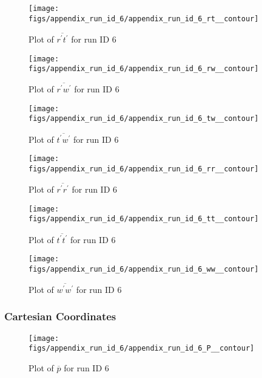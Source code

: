 \begin{figure}[H]
\centering
\texttt{[image: figs/appendix\_run\_id\_6/appendix\_run\_id\_6\_rt\_\_contour]}
\caption{Plot of $\overline{r^\prime t^\prime}$ for run ID 6}
\label{fig:appendix_run_id_6_rt__contour}
\end{figure}


\begin{figure}[H]
\centering
\texttt{[image: figs/appendix\_run\_id\_6/appendix\_run\_id\_6\_rw\_\_contour]}
\caption{Plot of $\overline{r^\prime w^\prime}$ for run ID 6}
\label{fig:appendix_run_id_6_rw__contour}
\end{figure}


\begin{figure}[H]
\centering
\texttt{[image: figs/appendix\_run\_id\_6/appendix\_run\_id\_6\_tw\_\_contour]}
\caption{Plot of $\overline{t^\prime w^\prime}$ for run ID 6}
\label{fig:appendix_run_id_6_tw__contour}
\end{figure}


\begin{figure}[H]
\centering
\texttt{[image: figs/appendix\_run\_id\_6/appendix\_run\_id\_6\_rr\_\_contour]}
\caption{Plot of $\overline{r^\prime r^\prime}$ for run ID 6}
\label{fig:appendix_run_id_6_rr__contour}
\end{figure}


\begin{figure}[H]
\centering
\texttt{[image: figs/appendix\_run\_id\_6/appendix\_run\_id\_6\_tt\_\_contour]}
\caption{Plot of $\overline{t^\prime t^\prime}$ for run ID 6}
\label{fig:appendix_run_id_6_tt__contour}
\end{figure}


\begin{figure}[H]
\centering
\texttt{[image: figs/appendix\_run\_id\_6/appendix\_run\_id\_6\_ww\_\_contour]}
\caption{Plot of $\overline{w^\prime w^\prime}$ for run ID 6}
\label{fig:appendix_run_id_6_ww__contour}
\end{figure}


\subsubsection{Cartesian Coordinates}
\begin{figure}[H]
\centering
\texttt{[image: figs/appendix\_run\_id\_6/appendix\_run\_id\_6\_P\_\_contour]}
\caption{Plot of $\overline{p}$ for run ID 6}
\label{fig:appendix_run_id_6_P__contour}
\end{figure}


